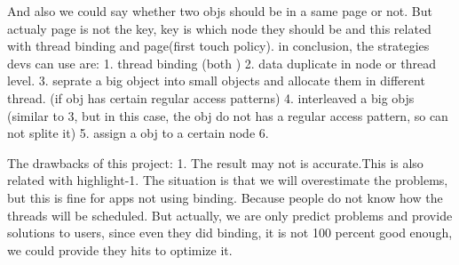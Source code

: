 And also we could say whether two objs should be in a same page or not. But actualy page is not the key, key is
which node they should be and this related with thread binding and page(first touch policy).
             in conclusion, the strategies devs can use are:
                1. thread binding (both )
                2. data duplicate in node or thread level.
                3. seprate a big object into small objects and allocate them in different thread. (if obj has certain regular access patterns)
                4. interleaved a big objs (similar to 3, but in this case, the obj do not has a regular access pattern, so can not splite it)
                5. assign a obj to a certain node
                6.

The drawbacks of this project:
        1. The result may not is accurate.This is also related with highlight-1. The situation is that we will overestimate the problems,
but this is fine for apps not using binding. Because people do not know how the threads will be scheduled.
        But actually, we are only predict problems and provide solutions to users, since even they did binding,
it is not 100 percent good enough, we could provide they hits to optimize it.